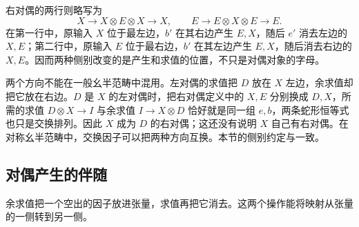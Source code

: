 \ProseParagraphBreak

右对偶的两行则略写为
\[
	X\longrightarrow X\otimes E\otimes X\longrightarrow X, \qquad E\longrightarrow E\otimes X\otimes E\longrightarrow E.
\]
在第一行中，原输入 \(X\) 位于最左边，\(b'\) 在其右边产生 \(E,X\)，随后 \(e'\) 消去左边的 \(X,E\)；第二行中，原输入 \(E\) 位于最右边，\(b'\) 在其左边产生 \(E,X\)，随后消去右边的 \(X,E\)。因而两种侧别改变的是产生和求值的位置，不只是对偶对象的字母。

\ProseParagraphBreak

两个方向不能在一般幺半范畴中混用。左对偶的求值把 \(D\) 放在 \(X\) 左边，余求值却把它放在右边。\(D\) 是 \(X\) 的左对偶时，把右对偶定义中的 \(X,E\) 分别换成 \(D,X\)，所需的求值 \(D\otimes X\to I\) 与余求值 \(I\to X\otimes D\) 恰好就是同一组 \(e,b\)，两条蛇形恒等式也只是交换排列。因此 \(X\) 成为 \(D\) 的右对偶；这还没有说明 \(X\) 自己有右对偶。在对称幺半范畴中，交换因子可以把两种方向互换。本节的侧别约定与\cite[Definitions 2.10.1--2.10.2, p. 40]{EtingofEtAl2015TensorCategories}一致。

\subsection{对偶产生的伴随}
\label{b4:subsec:monoidal-dual-adjunction}

余求值把一个空出的因子放进张量，求值再把它消去。这两个操作能将映射从张量的一侧转到另一侧。

